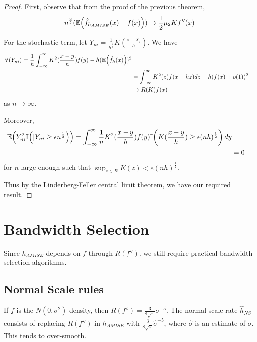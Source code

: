 \begin{proof}
  First, observe that from the proof of the previous theorem,
  \begin{align}
    \label{eq:27}
    n^{\frac{2}{5}} (\E{\hat f_{h_{AMISE}}(x) - f(x)}) \rightarrow
    \frac{1}{2} \mu_{2} K f''(x)
  \end{align}

  For the stochastic term, let $Y_{ni} = \frac{1}{h^{\frac{1}{2}}}
  K(\frac{x - X_{i}}{h})$.  We have
  \begin{align}
    \label{eq:28}
    \Var{Y_{ni}} = \frac{1}{h} \int_{-\infty}^{\infty}
    K^{2}(\frac{x-y}{n}) f(y) - h(\E{\hat f_{h}(x)})^{2} \\
    &= \int_{-\infty}^{\infty} K^{2}(z) f(x - hz) dz - h(f(x) +
    o(1))^{2} \\
    &\rightarrow R(K) f(x)
  \end{align} as $n \rightarrow \infty$.

  Moreover,
  \begin{align}
    \label{eq:29}
    \E{Y^{2}_{ni} \I{|Y_{ni} \geq \epsilon n^{\frac{1}{2}}}} =
    \int_{-\infty}^{\infty} \frac{1}{n} K^{2}(\frac{x - y}{h}) f(y)
    \I{K(\frac{x - y}{h}) \geq \epsilon (nh)^{\frac{1}{2}}} dy \\
    &= 0
  \end{align} for $n$ large enough such that $\sup_{z \in R} K(z) < e
  (nh)^\frac{1}{2}$.

  Thus by the Linderberg-Feller central limit theorem, we have our
  required result.
\end{proof}

\section{Bandwidth Selection}
\label{sec:bandwidth-selection}

Since $h_{AMISE}$ depends on $f$ through $R(f'')$, we still require
practical bandwidth selection algorithms.

\subsection{Normal Scale rules}
\label{sec:normal-scale-rules-1}

If $f$ is the $N(0, \sigma^{2})$ density, then $R(f'') = \frac{3}{8
  \sqrt{\pi}} \sigma^{-5}$.    The normal scale rate $\hat h_{NS}$
consists of replacing $R(f'')$ in $h_{AMISE}$ with $\frac{3}{8
  \sqrt{\pi}} \hat \sigma^{-5}$, where $\hat \sigma$ is an estimate of
$\sigma$.  This tends to over-smooth.

